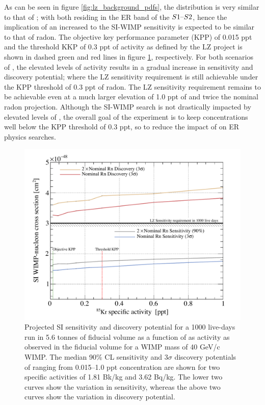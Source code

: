 {As can be seen in figure \ref{fig:lz_background_pdfs}, the \KrEF{} distribution is very similar to that of \RnTTT{}; with both residing in the ER band of the $S1\text{--}{}S2$, hence the implication of an increased \KrEF{} to the SI-WIMP sensitivity is expected to be similar to that of radon. The objective key performance parameter (KPP) of 0.015 ppt and the threshold KKP of 0.3 ppt of \KrEF{} activity as defined by the LZ project is shown in dashed green and red lines in figure \ref{fig:krypton_sensitivity_discovery}, respectively. For both scenarios of \RnTTT{}, the elevated levels of \KrEF{} activity results in a gradual increase in sensitivity and discovery potential; where the LZ sensitivity requirement is still achievable under the KPP threshold of 0.3 ppt of radon. The LZ sensitivity requirement remains to be achievable even at a much larger elevation of 1.0 ppt of \KrEF{} and twice the nominal radon projection. Although the SI-WIMP search is not drastically impacted by elevated levels of \KrEF{}, the overall goal of the experiment is to keep \KrEF{} concentrations well below the KPP threshold of 0.3 ppt, so to reduce the impact of \KrEF{} on ER physics searches.

%
\begin{figure}[h!]
    \centering
    \includegraphics[scale=0.8]{Chapter_5/Figures/sensitivity_studies/lz_krypton_vs_sensitivity.pdf}
    \caption[Projected SI sensitivity and discovery potential for a 1000 live-days run in 5.6 tonnes of fiducial volume as a function of \KrEF{} as activity as observed in the fiducial volume for a WIMP mass of 40 GeV/c\squared{} WIMP.]%
    {Projected SI sensitivity and discovery potential for a 1000 live-days run in 5.6 tonnes of fiducial volume as a function of \KrEF{} as activity as observed in the fiducial volume for a WIMP mass of 40 GeV/c\squared{} WIMP. The median 90\% CL sensitivity and $3\sigma$ discovery potentials of \KrEF{} ranging from 0.015--1.0 ppt concentration are shown for two \RnTTT{} specific activities of 1.81 \micro{}Bk/kg and 3.62 \micro{}Bq/kg. The lower two curves show the variation in sensitivity, whereas the above two curves show the variation in discovery potential.}
    \label{fig:krypton_sensitivity_discovery}
\end{figure}
%


}
